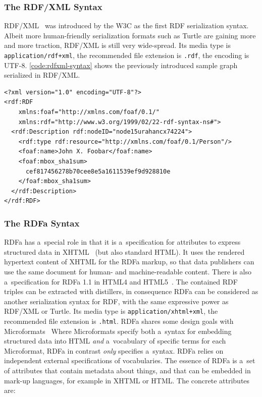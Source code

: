 \subsubsection{The RDF/XML Syntax}
RDF/XML~\cite{Beckett2004} was introduced by the W3C as the first RDF serialization syntax.
Albeit more human-friendly serialization formats such as Turtle are gaining more and more traction,
RDF/XML is still very wide-spread.
Its media type is \texttt{application/rdf+xml}, the recommended file extension is \texttt{.rdf},
the encoding is UTF-8.
\autoref{code:rdfxml-syntax} shows the previously introduced sample graph serialized in RDF/XML.

\begin{lstlisting}[caption={A sample graph in RDF/XML syntax.},label={code:rdfxml-syntax}]
<?xml version="1.0" encoding="UTF-8"?>
<rdf:RDF
    xmlns:foaf="http://xmlns.com/foaf/0.1/"
    xmlns:rdf="http://www.w3.org/1999/02/22-rdf-syntax-ns#">
  <rdf:Description rdf:nodeID="node15urahancx74224">
    <rdf:type rdf:resource="http://xmlns.com/foaf/0.1/Person"/>
    <foaf:name>John X. Foobar</foaf:name>
    <foaf:mbox_sha1sum>
      cef817456278b70cee8e5a1611539ef9d928810e
    </foaf:mbox_sha1sum>
  </rdf:Description>
</rdf:RDF>
\end{lstlisting}

\subsubsection{The RDFa Syntax}
RDFa has a~special role in that it is a~specification for attributes to express structured data
in XHTML~\cite{Adida2008} (but also standard HTML).
It uses the rendered hypertext content of XHTML for the RDFa markup,
so that data publishers can use the same document for human- and machine-readable content.
There is also a~specification for RDFa 1.1 in HTML4 and HTML5~\cite{Sporny2011}.
The contained RDF triples can be extracted with distillers,
in consequence RDFa can be considered as another serialization syntax for RDF,
with the same expressive power as RDF/XML or Turtle.
Its media type is \texttt{application/xhtml+xml}, the recommended file extension is \texttt{.html}.
RDFa shares some design goals with Microformats~\cite{Celik2006}
Where Microformats specify both a~syntax for embedding structured data into HTML
\emph{and} a~vocabulary of specific terms for each Microformat,
RDFa in contrast \emph{only} specifies a~syntax.
RDFa relies on independent external specifications of vocabularies.
The essence of RDFa is a~set of attributes that contain metadata about things,
and that can be embedded in mark-up languages, for example in XHTML or HTML.
The concrete attributes are:


